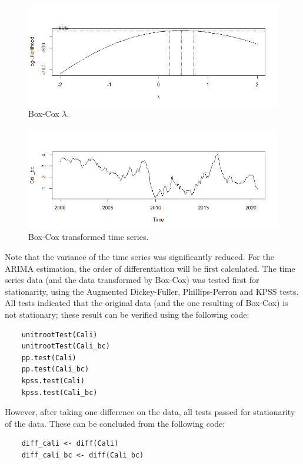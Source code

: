 \documentclass[fleqn]{article}
\begin{document}
\begin{enumerate}
    \begin{figure}[H]
        \centering
        \includegraphics[width=\linewidth]{figs/cox.png}
        \caption{Box-Cox $\lambda$.}
        \label{fig:cox}
    \end{figure}
    \begin{figure}[H]
        \centering
        \includegraphics[width=\linewidth]{figs/TSCox.png}
        \caption{Box-Cox transformed time series.}
        \label{fig:TSCox}
    \end{figure}
    Note that the variance of the time series was significantly reduced. For the ARIMA estimation, the order of differentiation will be first calculated. The time series data (and the data transformed by Box-Cox) was tested first for stationarity, using the Augmented Dickey-Fuller, Phillips-Perron and KPSS tests. All tests indicated that the original data (and the one resulting of Box-Cox) is not stationary; these result can be verified using the following code:
    \begin{verbatim}
    unitrootTest(Cali)
    unitrootTest(Cali_bc)
    pp.test(Cali)
    pp.test(Cali_bc)
    kpss.test(Cali)
    kpss.test(Cali_bc)
    \end{verbatim}
    However, after taking one difference on the data, all tests passed for stationarity of the data. These can be concluded from the following code:
    \begin{verbatim}
    diff_cali <- diff(Cali)
    diff_cali_bc <- diff(Cali_bc)
    

\end{verbatim}
\end{enumerate}
\end{document}
